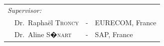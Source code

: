 {\begin{titlepage}

\begin{center}
\noindent \large
\begin{tabular}{llcl}


\textit{Supervisor:}&     & & \\
\multicolumn{2}{l}{~~Dr.\ Rapha\"el \textsc{Troncy}} & - & EURECOM, France \\
\multicolumn{2}{l}{~~Dr.\ Aline \textsc{S�nart}}     & - & SAP, France \\

\end{tabular}
\end{center}

\end{titlepage}

}
